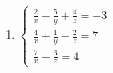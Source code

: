 \documentclass{report}
\begin{document}
\begin{multicols}{2}
\begin{enumerate}[wide, labelwidth=!, labelindent=0pt]
        \item $\begin{cases}
                      \frac{2}{x} - \frac{5}{y} + \frac{4}{z} = -3 \\
                      \frac{4}{x} + \frac{1}{y} - \frac{2}{z} = 7  \\
                      \frac{7}{x} - \frac{3}{z} = 4
                  \end{cases}$

    \end{enumerate}

\end{multicols}
\end{document}
